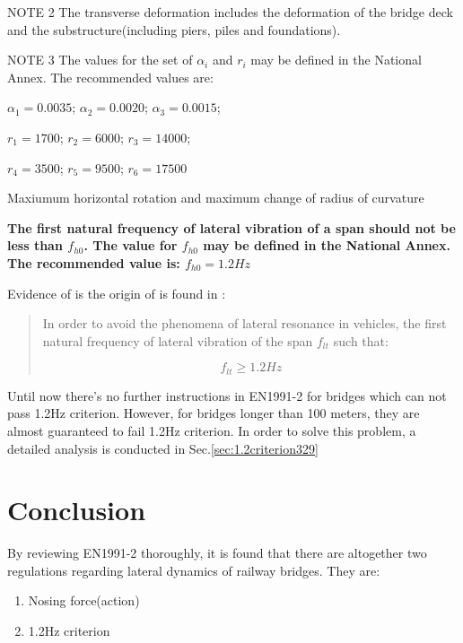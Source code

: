 \begin{appendices}
\begin{table}[h]
	NOTE 2 The transverse deformation includes the deformation of the bridge deck and the substructure(including piers, piles and foundations).
			
	NOTE 3 The values for the set of $\alpha_i$ and $r_i$ may be defined in the National Annex. The recommended values are:
			
	$ \alpha_1 = 0.0035$; $\alpha_2=0.0020$; $\alpha_3=0.0015$;
			
	$ r_1  =1700$; $r_2=6000$; $r_3=14000$;
			
	$ r_4 = 3500$; $r_5 = 9500$; $ r_6 = 17500$
	
	\caption{Maxiumum horizontal rotation and maximum change of radius of curvature}
	\label{tab:maximumhorizontalrotation}
\end{table}

\textbf{The first natural frequency of lateral vibration of a span should not be less than $f_{h0}$. The value for $f_{h0}$ may be defined in the National Annex. The recommended value is: $f_{h0}=1.2 Hz$}

Evidence of \citet{d181} is the origin of \citet[A.2.4.4.2.4(3)]{EC12} is found in \citet[p4.2: Lateral Frequencies]{d181}:

\begin{quote}
In order to avoid the phenomena of lateral resonance in vehicles, the first natural frequency of lateral vibration of the span $f_{lt}$ such that:

$$f_{lt} \geq 1.2Hz$$

\end{quote}

Until now there's no further instructions in EN1991-2 for bridges which can not pass 1.2Hz criterion. However, for bridges longer than 100 meters, they are almost guaranteed to fail 1.2Hz criterion. In order to solve this problem, a detailed analysis is conducted in Sec.\ref{sec:1.2criterion329}

\section{Conclusion}

By reviewing EN1991-2 thoroughly, it is found that there are altogether two regulations regarding lateral dynamics of railway bridges. They are:

\begin{enumerate}
	\item Nosing force(action)
	\item 1.2Hz criterion 
\end{enumerate}


\end{appendices}
